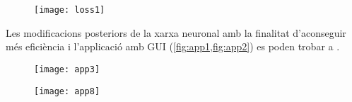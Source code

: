\begin{refsection}
	\begin{figure}[H]
		\centering
		\texttt{[image: loss1]}
		\label{fig:loss1}
	\end{figure}

	Les modificacions posteriors de la xarxa neuronal amb la finalitat d'aconseguir més eficiència i l'applicació amb GUI (\cref{fig:app1,fig:app2}) es poden trobar a \cite{mygithub}.
	
	\begin{figure}[H]
		\centering
		\texttt{[image: app3]}
		\label{fig:app1}
	\end{figure}

	\begin{figure}[H]
		\centering
		\texttt{[image: app8]}
		\label{fig:app2}
	\end{figure}

	\printbibliography[heading=subbibintoc]

\end{refsection}
